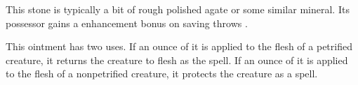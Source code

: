 {

 This stone is typically a bit of rough polished agate or some similar mineral. Its possessor gains a  enhancement bonus on saving throws .

\begin{comment}
Stone Horse} Each item of this nature appears to be a fullsized, roughly hewn statue of a horse, carved from some type of hard stone. A command word brings the steed to life, enabling it to carry a burden and even to attack as if it were a real horse of the appropriate kind.

A stone horse can carry 1,000 pounds tirelessly and never needs to rest or feed. Damage dealt to it can be repaired by first using a \my{\spell{transmute flesh and stone}} spell, thus causing the stone horse to become a normal horse that can be healed normally. When fully healed, it automatically reverts to its stone form. While in its stone form, it can be fed gems, healing 1 point of damage for each 50 gp worth of mineral it is given.

There are two sorts of stone horses.

Courser} This item has the statistics of a heavy horse as well as having hardness 10.

Destrier} This item has the statistics of a heavy warhorse as well as having hardness 10.

Strong transmutation; CL 14th; Craft Wondrous Item, flesh to stone, animate objects; Price 10,000 gp (courser) or 14,800 gp (destrier);Weight 6,000 lb.
\end{comment}

 This ointment has two uses. If an ounce of it is applied to the flesh of a petrified creature, it returns the creature to flesh as the   spell. If an ounce of it is applied to the flesh of a nonpetrified creature, it protects the creature as a  spell.

}

